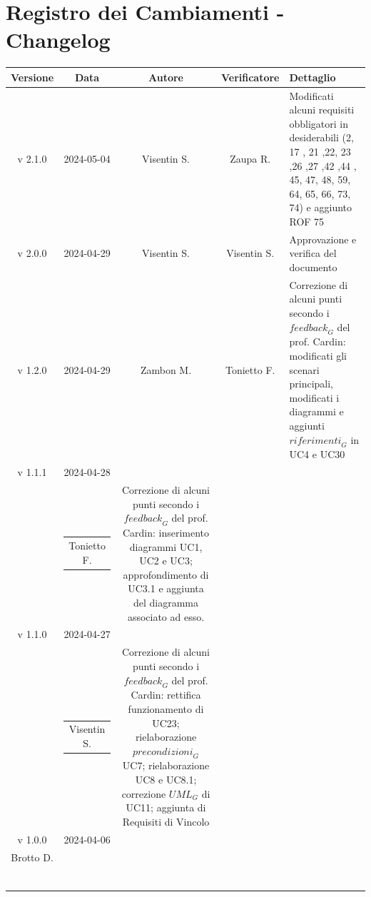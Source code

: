\documentclass[12pt, oneside]{article}
\begin{document}
\section*{Registro dei Cambiamenti - Changelog}
\begin{longtable}{|c|c|c|c|p{7cm}|}
\hline
\textbf{Versione} & \textbf{Data} & \textbf{Autore} & \textbf{Verificatore} & 
\textbf{Dettaglio} \\
\hline
v 2.1.0 & 2024-05-04 & Visentin S. & Zaupa R. & Modificati alcuni requisiti obbligatori in desiderabili (2, 17 , 21 ,22, 23 ,26 ,27 ,42 ,44 , 45,  47, 48, 59, 64, 65, 66, 73, 74) e aggiunto ROF 75\\
\hline
v 2.0.0 & 2024-04-29 & Visentin S. & Visentin S. & Approvazione e verifica del documento\\
\hline
v 1.2.0 & 2024-04-29 & Zambon M. & Tonietto F. & Correzione di alcuni punti secondo i $\textit{feedback}_G$ del prof. Cardin: modificati gli scenari principali, modificati i diagrammi e aggiunti $\textit{riferimenti}_G$ in UC4 e UC30\\
\hline
v 1.1.1 & 2024-04-28 &   \begin{tabular}[c]{@{}c@{}}
    Basso L. \\
  \end{tabular}  & \begin{tabular}[c]{@{}c@{}}
    Tonietto F.
  \end{tabular} & Correzione di alcuni punti secondo i $\textit{feedback}_G$ del prof. Cardin: inserimento diagrammi UC1, UC2 e UC3; approfondimento di UC3.1 e aggiunta del diagramma associato ad esso.\\
\hline
v 1.1.0 & 2024-04-27 &   \begin{tabular}[c]{@{}c@{}}
    Tonietto F. \\
  \end{tabular}  & \begin{tabular}[c]{@{}c@{}}
    Visentin S.
  \end{tabular} & Correzione di alcuni punti secondo i $\textit{feedback}_G$ del prof. Cardin: rettifica funzionamento di UC23; rielaborazione $\textit{precondizioni}_G$ UC7; rielaborazione UC8 e UC8.1; correzione $\textit{UML}_G$ di UC11; aggiunta di Requisiti di Vincolo\\
\hline 
v 1.0.0 & 2024-04-06 &   \begin{tabular}[c]{@{}c@{}}
    Zaupa R. \\
    Brotto D. \\
  \end{tabular}  & \begin{tabular}[c]{@{}c@{}}

\end{tabular}
\end{longtable}
\end{document}
